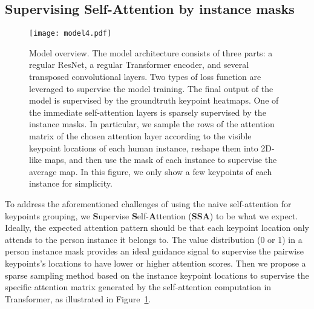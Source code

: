 \documentclass{article} \usepackage{iclr_conference,times}
\begin{document}
\subsection{Supervising Self-Attention by instance masks}

\begin{figure}
    \centering
    \texttt{[image: model4.pdf]}
    \caption{Model overview. The model architecture consists of three parts: a regular ResNet, a regular Transformer encoder, and several transposed convolutional layers. Two types of loss function are leveraged to supervise the model training. The final output of the model is supervised by the groundtruth keypoint heatmaps. One of the immediate self-attention layers is sparsely supervised by the instance masks. In particular, we sample the rows of the attention matrix of the chosen attention layer according to the visible keypoint locations of each human instance, reshape them into 2D-like maps, and then use the mask of each instance to supervise the average map. In this figure, we only show a few keypoints of each instance for simplicity.}
    \label{fig:model}\vspace{-0.5em}
\end{figure}

To address the aforementioned challenges of using the naive self-attention for keypoints grouping, we \textbf{S}upervise \textbf{S}elf-\textbf{A}ttention (\textbf{SSA}) to be what we expect. Ideally, the expected attention pattern should be that each keypoint location only attends to the person instance it belongs to. The value distribution (0 or 1) in a person instance mask provides an ideal guidance signal to supervise the pairwise keypoints's locations to have lower or higher attention scores. 
Then we propose a sparse sampling method based on the instance keypoint locations to supervise the specific attention matrix generated by the self-attention computation in Transformer, as illustrated in Figure~\ref{fig:model}.
\end{document}
